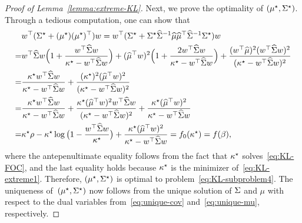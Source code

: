 \documentclass{article}
\begin{document}
\begin{proof}[Proof of Lemma~\ref{lemma:extreme-KL}]
	Next, we prove the optimality of $(\mu^\star, \Sigma^\star)$.
	Through a tedious computation, one can show that
	\begin{align*}
	    &w^\top (\Sigma^\star + (\mu^\star)(\mu^\star)^\top) w = w^\top (\Sigma^\star + \Sigma^\star \widehat{\Sigma}^{-1} \widehat {\mu} \widehat {\mu}^\top \widehat{\Sigma}^{-1} \Sigma^\star) w\\
	    =& w^\top \widehat{\Sigma} w \Big(1 + \frac{w^\top \widehat{\Sigma} w}{\kappa^\star - w^\top \widehat{\Sigma} w} \Big) + (\widehat {\mu}^\top w)^2 \Big( 1 + \frac{2 w^\top \widehat{\Sigma} w}{\kappa^\star - w^\top \widehat{\Sigma} w} \Big) + \frac{(w^\top \widehat {\mu})^2 (w^\top \widehat{\Sigma} w)^2}{(\kappa^\star - w^\top \widehat{\Sigma} w)^2}\\
	    =& \frac{\kappa^\star w^\top \widehat{\Sigma} w}{\kappa^\star - w^\top \widehat{\Sigma} w} + \frac{(\kappa^\star)^2 (\widehat {\mu}^\top w)^2}{(\kappa^\star - w^\top \widehat{\Sigma} w)^2} \\
	    =& \frac{\kappa^\star w^\top \widehat{\Sigma} w}{\kappa^\star - w^\top \widehat{\Sigma} w}  + \frac{\kappa^\star (\widehat {\mu}^\top w)^2 w^\top \widehat{\Sigma} w}{(\kappa^\star - w^\top \widehat{\Sigma} w)^2} + \frac{\kappa^\star (\widehat {\mu}^\top w)^2}{\kappa^\star - w^\top \widehat{\Sigma} w} \\
	    =& \kappa^\star \rho - \kappa^\star \log \big( 1- \frac{w^\top \widehat{\Sigma} w}{\kappa^\star} \big)  + \frac{\kappa^\star (\widehat {\mu}^\top w)^2}{\kappa^\star - w^\top \widehat{\Sigma} w} = f_0(\kappa^\star) = f(\beta),
	\end{align*}
	where the antepenultimate equality follows from the fact that $\kappa^\star$ solves~\eqref{eq:KL-FOC}, and the last equality holds because $\kappa^\star$ is the minimizer of~\eqref{eq:KL-extreme1}. Therefore, $(\mu^\star, \Sigma^\star)$ is optimal to problem~\eqref{eq:KL-subproblem4}. The uniqueness of~$(\mu^\star, \Sigma^\star)$ now follows from the unique solution of $\Sigma$ and $\mu$ with respect to the dual variables from~\eqref{eq:unique-cov} and~\eqref{eq:unique-mu}, respectively.
	

\end{proof}
\end{document}
